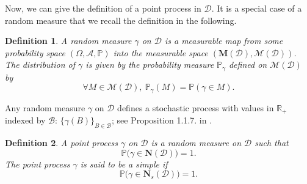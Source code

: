 \documentclass[twoside,11pt]{book}
\newtheorem{definition}{Definition}
\numberwithin{theorem}{chapter}
\numberwithin{definition}{chapter}
\numberwithin{proposition}{chapter}
\numberwithin{corollary}{chapter}
\numberwithin{example}{chapter}
\numberwithin{lemma}{chapter}
\numberwithin{assumption}{chapter}
\numberwithin{equation}{chapter}
\numberwithin{figure}{chapter}
\begin{document}

Now, we can give the definition of a point process in $\mathcal{D}$. It is a special case of a random measure that we recall the definition in the following. 





\begin{definition}
A random measure $\gamma$ on $\mathcal{D}$ is a measurable map from some probability space $(\Omega, \mathcal{A}, \mathbb{P})$  into the measurable space $(\mathbf{M}(\mathcal{D}), \mathcal{M}(\mathcal{D}))$. The distribution of $\gamma$ is given by the probability measure $\mathbb{P}_{\gamma}$ defined on $\mathcal{M}(\mathcal{D})$ by
\begin{equation}
\forall M \in \mathcal{M}(\mathcal{D}), \:\mathbb{P}_{\gamma}(M) = \mathbb{P}(\gamma \in M).
\end{equation}

\end{definition}

Any random measure $\gamma$ on $\mathcal{D}$ defines a stochastic process with values in $\mathbb{R}_{+}$ indexed by $\mathcal{B}$: $\{\gamma(B)\}_{B \in \mathcal{B}}$; see Proposition  1.1.7. in \citep*{BaBlKa20}.

\begin{definition}
A point process $\gamma$ on $\mathcal{D}$ is a random measure on $\mathcal{D}$ such that
\begin{equation}
\mathbb{P} \big(\gamma \in \mathbf{N} (\mathcal{D}) \big) = 1.
\end{equation}
The point process $\gamma$ is said to be a simple if 
\begin{equation}
\mathbb{P}\big( \gamma \in \mathbf{N}_{s}(\mathcal{D})\big) = 1.
\end{equation}

\end{definition}
\end{document}
